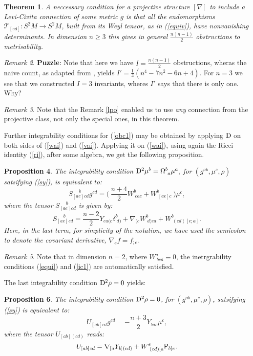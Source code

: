 \documentclass[letterpaper]{amsart}
\newtheorem{theorem}{Theorem}[section]
\newtheorem{proposition}[theorem]{Proposition}
\theoremstyle{definition}
\theoremstyle{remark}
\newtheorem{remark}[theorem]{Remark}
\newcommand{\be}{\begin{equation}}
\newcommand{\ee}{\end{equation}}
\newcommand{\D}{{\rm D}}
\newcommand{\Rho}{{\mbox{\sf P}}}
\begin{document}
\begin{theorem}\label{sto2}
A neccessary condition for a projective structure $[\nabla]$ to
include a Levi-Civita connection of some metric $g$ is that all the
endomorphisms ${\mathcal T}_{[ed]}:S^2M\to S^2M$, built from its Weyl
tensor, as in
(\ref{equiv}), have nonvanishing
determinants. In dimension $n\geq 3$ this gives in general $\frac{n(n-1)}{2}$
obstructions to metrisability.  
\end{theorem}
\begin{remark}
{\bf Puzzle}: Note that here we have $I=\frac{n(n-1)}{2}$ obstructions, wheras
the naive count, as adapted from \cite{bde}, yields 
$I'=\tfrac14(n^4-7n^2-6n+4)$. For $n=3$ we see that we constructed
$I=3$ invariants, wheres $I'$ says that there is only one. Why?
\end{remark}
\begin{remark}
Note that the Remark \ref{lpo} enabled us to use \emph{any} connection
from the projective class, not only the special ones, in this theorem.  
\end{remark} 
Further integrability conditions for (\ref{obc1}) may be obtained by applying $\D$ on both sides
of (\ref{wai}) and (\ref{vai}). Applying it on (\ref{wai}), using again the Ricci identity
(\ref{ri}), after some algebra, we get the following proposition.
\begin{proposition}\label{sto3}
The integrability condition $\D^2\mu^b=\Omega^b_{~a}\mu^a$, for
$(g^{ab},\mu^c,\rho)$ satsifying (\ref{sy}), is equivalent to:
\be S_{[ae]}^{\quad \,\, b}\phantom{}_{cd}g^{cd}=\big(~
\frac{n+4}{2} W^b_{~cae}+W^b_{~[ae]c}~\big)\mu^c,\label{ic1}\ee
where the tensor $S_{[ae]}^{\quad \,\, b}\phantom{}_{cd}$ is given by:
$$S_{[ae]}^{\quad \,\, b}\phantom{}_{cd}=\frac{n-2}{2}Y_{ea(c}\delta^b_{~d)}+\nabla_{(c}W^b_{~d)ea}+W^b_{~(cd)[e;a]}.$$
Here, in the last term, for simplicity of the notation, we have used
the semicolon to denote the covariant derivative, $\nabla_ef=f_{;e}$. 
\end{proposition}  
\begin{remark}
Note that in dimension $n=2$, where $W^a_{~bcd}\equiv 0$, the 
inetrgrability conditions (\ref{equi}) and (\ref{ic1}) are automatically satisfied.
\end{remark}
The last integrability condition $\D^2\rho=0$ yields:
\begin{proposition}\label{sto4}
The integrability condition $\D^2\rho=0$, for
$(g^{ab},\mu^c,\rho)$, satsifying (\ref{sy}) is equivalent to:
\be
U_{[ab]cd}g^{cd}=-\frac{n+3}{2}Y_{bac}\mu^c,\label{i2}
\ee
where the tensor $U_{[ab](cd)}$ reads:
$$U_{[ab]cd}=\nabla_{[a}Y_{b](cd)}+W^e_{~(cd)[a}\Rho_{b]e}.$$
\end{proposition} 
\end{document}
